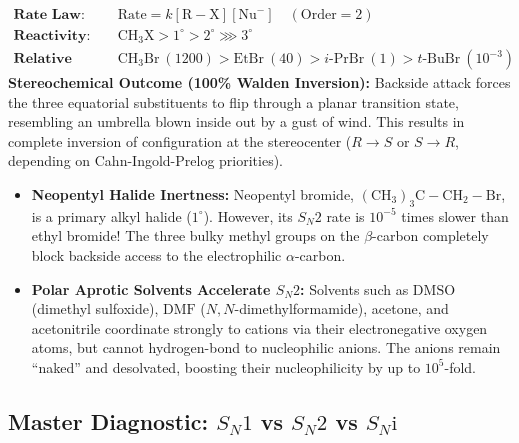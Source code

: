 \documentclass[10pt,twoside,openright]{book}
\begin{document}
\begin{formulabox}
\begin{align*}
  \textbf{Rate Law:} \quad & \text{Rate} = k[\mathrm{R-X}][\mathrm{Nu}^-] \quad (\text{Order} = 2)\\
  \textbf{Reactivity:} \quad & \mathrm{CH_3X} > 1^\circ > 2^\circ \ggg 3^\circ \\
  \textbf{Relative Rates:} \quad & \mathrm{CH_3Br} \ (1200) > \mathrm{EtBr} \ (40) > i\text{-PrBr} \ (1) > t\text{-BuBr} \ (10^{-3})
\end{align*}
\textbf{Stereochemical Outcome (100\% Walden Inversion):}
Backside attack forces the three equatorial substituents to flip through a planar transition state, resembling an umbrella blown inside out by a gust of wind. This results in complete inversion of configuration at the stereocenter ($R \to S$ or $S \to R$, depending on Cahn-Ingold-Prelog priorities).
\end{formulabox}

\begin{trapbox}
\begin{itemize}
  \item \textbf{Neopentyl Halide Inertness:} Neopentyl bromide, $\mathrm{(CH_3)_3C-CH_2-Br}$, is a primary alkyl halide ($1^\circ$). However, its $S_N2$ rate is $10^{-5}$ times slower than ethyl bromide! The three bulky methyl groups on the $\beta$-carbon completely block backside access to the electrophilic $\alpha$-carbon.
  \item \textbf{Polar Aprotic Solvents Accelerate $S_N2$:} Solvents such as $\mathrm{DMSO}$ (dimethyl sulfoxide), $\mathrm{DMF}$ ($N,N$-dimethylformamide), acetone, and acetonitrile coordinate strongly to cations via their electronegative oxygen atoms, but cannot hydrogen-bond to nucleophilic anions. The anions remain ``naked'' and desolvated, boosting their nucleophilicity by up to $10^5$-fold.
\end{itemize}
\end{trapbox}

\subsection{Master Diagnostic: \texorpdfstring{$S_N1$}{SN1} vs \texorpdfstring{$S_N2$}{SN2} vs \texorpdfstring{$S_N\mathrm{i}$}{SNi}}
\end{document}
